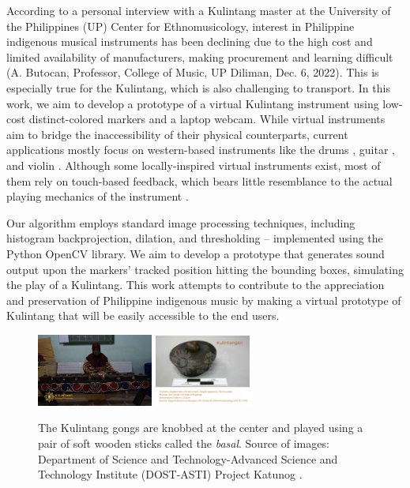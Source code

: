 \documentclass[10pt,a4paper,twoside]{article}
\begin{document}
According to a personal interview with a Kulintang master at the University of the Philippines (UP) Center for Ethnomusicology, interest in Philippine indigenous musical instruments has been declining due to the high cost and limited availability of manufacturers, making procurement and learning difficult (A. Butocan, Professor, College of Music, UP Diliman, Dec. 6, 2022). This is especially true for the Kulintang, which is also challenging to transport. In this work, we aim to develop a prototype of a virtual Kulintang instrument using low-cost distinct-colored markers and a laptop webcam. While virtual instruments aim to bridge the inaccessibility of their physical counterparts, current applications mostly focus on western-based instruments like the drums \cite{tolentino_air_2019}, guitar \cite{karjalainen_virtual_2006, pakarinen_virtual_2008, tamani_building_2018}, and violin \cite{Fan2013}. Although some locally-inspired virtual instruments exist, most of them rely on touch-based feedback, which bears little resemblance to the actual playing mechanics of the instrument \cite{tanfelix_virtual_2020, baltazar_digital_2020, lucas_digital_2013}.

Our algorithm employs standard image processing techniques, including histogram backprojection, dilation, and thresholding -- implemented using the Python OpenCV library. We aim to develop a prototype that generates sound output upon the markers' tracked position hitting the bounding boxes, simulating the play of a Kulintang. This work attempts to contribute to the appreciation and preservation of Philippine indigenous music by making a virtual prototype of Kulintang that will be easily accessible to the end users.

\begin{figure}[h!]
\centering
\includegraphics[width=0.34\textwidth]{MR_KULINTANG.jpeg}\label{fig:kulintang}
\quad %
\includegraphics[width=0.28\textwidth]{Kulintangan (275b).png}\label{fig:gong}
\caption{The Kulintang gongs are knobbed at the center and played using a pair of soft wooden sticks called the \emph{basal}. Source of images: Department of Science and Technology-Advanced Science and Technology Institute (DOST-ASTI) Project Katunog \cite{philippine_copyright_2023_by_dost-asti_and_up_kulintang_2019, philippine_copyright_2023_by_dost-asti_and_up_kulintangan_2019}.}
\label{fig:Kulintangan}
\end{figure}
\end{document}
